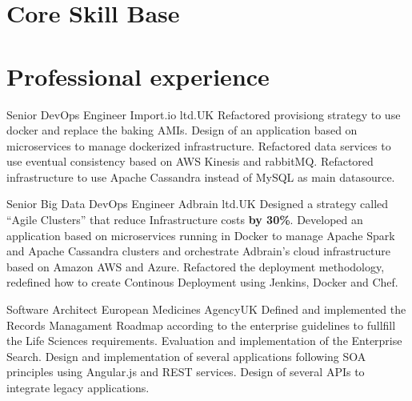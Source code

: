 \documentclass[10pt, a4paper]{moderncv}
\begin{document}
\maketitle


%
%

\section{Core Skill Base}

\cvline{}{}

\section{Professional experience}
{Senior DevOps Engineer}
{Import.io ltd.}{UK}{}
{Refactored provisiong strategy to use docker and replace the baking AMIs. Design of an application based on microservices to manage dockerized infrastructure. Refactored data services to use eventual consistency based on AWS Kinesis and rabbitMQ. Refactored infrastructure to use Apache Cassandra instead of MySQL as main datasource.\\}

\cvline{}{}

{Senior Big Data DevOps Engineer}
{Adbrain ltd.}{UK}{}
{Designed a strategy called  ``Agile Clusters'' that reduce Infrastructure costs \textbf{by 30\%}. Developed an application based on microservices running in Docker to manage Apache Spark and Apache Cassandra clusters and orchestrate Adbrain's cloud infrastructure based on Amazon AWS and Azure. Refactored the deployment methodology, redefined how to create Continous Deployment using Jenkins, Docker and Chef.\\}

\cvline{}{}


{Software Architect}
{European Medicines Agency}{UK}{}
{Defined and implemented the Records Managament Roadmap according to the enterprise guidelines to fullfill the Life Sciences requirements. Evaluation and implementation of the Enterprise Search. Design and implementation of several applications following SOA principles using Angular.js and REST services. Design of several APIs to integrate legacy applications.\\}
\end{document}
